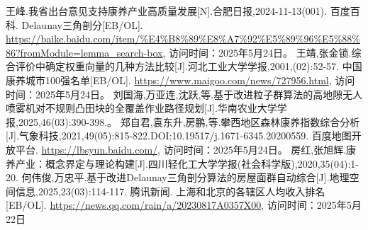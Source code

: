 \documentclass[12pt,a4paper]{article}
\begin{document}
\begin{thebibliography}{99}
         王峰.我省出台意见支持康养产业高质量发展[N].合肥日报,2024-11-13(001).
         百度百科. Delaunay三角剖分[EB/OL]. \url{https://baike.baidu.com/item/%E4%B8%89%E8%A7%92%E5%89%96%E5%88%86?fromModule=lemma_search-box}, 访问时间：2025年5月24日。
         王靖,张金锁.综合评价中确定权重向量的几种方法比较[J].河北工业大学学报,2001,(02):52-57.
         中国康养城市100强名单[EB/OL]. \url{https://www.maigoo.com/news/727956.html}, 访问时间：2025年5月24日。
         刘国海,万亚连,沈跃,等.基于改进粒子群算法的高地隙无人喷雾机对不规则凸田块的全覆盖作业路径规划[J].华南农业大学学报,2025,46(03):390-398.。
         郑自君,袁东升,房鹏,等.攀西地区森林康养指数综合分析[J].气象科技,2021,49(05):815-822.DOI:10.19517/j.1671-6345.20200559.
         百度地图开放平台. \url{https://lbsyun.baidu.com/}, 访问时间：2025年5月24日。
         房红,张旭辉.康养产业：概念界定与理论构建[J].四川轻化工大学学报(社会科学版),2020,35(04):1-20.
         何伟俊,万忠平.基于改进Delaunay三角剖分算法的房屋面群自动综合[J].地理空间信息,2025,23(03):114-117.
         腾讯新闻. 上海和北京的各辖区人均收入排名[EB/OL]. \url{https://news.qq.com/rain/a/20230817A0357X00}, 访问时间：2025年5月22日


\end{thebibliography}
\end{document}
